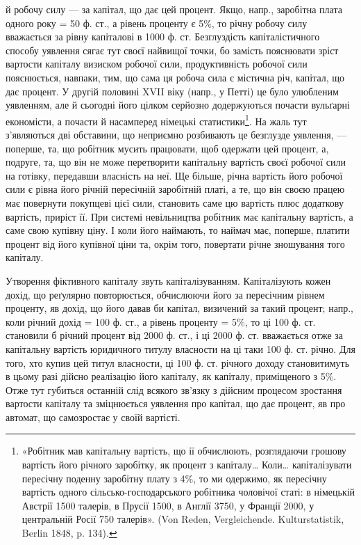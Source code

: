 \parcont{}  %
й робочу силу — за капітал, що дає цей процент. Якщо, напр., заробітна плата
одного року = 50 ф. ст., а рівень проценту є 5\%, то річну робочу силу вважається
за рівну капіталові в 1000 ф. ст. Безглуздість капіталістичного способу
уявлення сягає тут своєї найвищої точки, бо замість пояснювати зріст вартости
капіталу визиском робочої сили, продуктивність робочої сили пояснюється, навпаки,
тим, що сама ця робоча сила є містична річ, капітал, що дає процент.
У другій половині XVII віку (напр., у Петті) це було улюбленим уявленням,
але й сьогодні його цілком серйозно додержуються почасти вульґарні економісти,
а почасти й насамперед німецькі статистики\footnote{
«Робітник мав капітальну вартість, що ії обчислюють, розглядаючи грошову вартість його
річного заробітку, як процент з капіталу\dots{} Коли\dots{} капіталізувати пересічну поденну заробітну
плату з 4\%, то ми одержимо, як пересічну вартість одного сільсько-господарського робітника чоловічої
статі: в німецькій Австрії 1500 талерів, в Прусії 1500, в Англії 3750, у Франції 2000, у
центральній Росії 750 талерів». (Von Reden, Vergleichende. Kulturstatistik, Berlin 1848, p. 134).
}. На жаль тут з’являються дві
обставини, що неприємно розбивають це безглузде уявлення, — поперше, та, що
робітник мусить працювати, щоб одержати цей процент, а, подруге, та, що він
не може перетворити капітальну вартість своєї робочої сили на готівку, передавши
власність на неї. Ще більше, річна вартість його робочої сили є рівна
його річній пересічній заробітній платі, а те, що він своєю працею має повернути
покупцеві цієї сили, становить саме цю вартість плюс додаткову вартість,
приріст її. При системі невільництва робітник має капітальну вартість, а саме
свою купівну ціну. І коли його наймають, то наймач має, поперше, платити
процент від його купівної ціни та, окрім того, повертати річне зношування
того капіталу.

Утворення фіктивного капіталу звуть капіталізуванням. Капіталізують кожен
дохід, що реґулярно повторюється, обчислюючи його за пересічним рівнем проценту,
яв дохід, що його давав би капітал, визичений за такий процент; напр.,
коли річний дохід = 100 ф. ст., а рівень проценту = 5\%, то ці 100 ф. ст.
становили б річний процент від 2000 ф. ст., і ці 2000 ф. ст. вважається отже
за капітальну вартість юридичного титулу власности на ці таки 100 ф. ст.
річно. Для того, хто купив цей титул власности, ці 100 ф. ст. річного доходу
становитимуть в цьому разі дійсно реалізацію його капіталу, як капіталу, приміщеного
з 5\%. Отже тут губиться останній слід всякого зв’язку з дійсним
процесом зростання вартости капіталу та зміцнюється уявлення про капітал, що
дає процент, яв про автомат, що самозростає у своїй вартісті.

